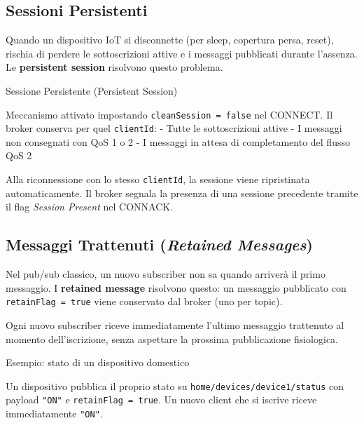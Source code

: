 \documentclass[
  italian,
  openany]{book}
\begin{document}
\subsection{Sessioni Persistenti}\label{sessioni-persistenti}

Quando un dispositivo IoT si disconnette (per sleep, copertura persa,
reset), rischia di perdere le sottoscrizioni attive e i messaggi
pubblicati durante l'assenza. Le \textbf{persistent session} risolvono
questo problema.

\begin{calloutdefinition}{Sessione Persistente (Persistent Session)}

Meccanismo attivato impostando \texttt{cleanSession\ =\ false} nel
CONNECT. Il broker conserva per quel \texttt{clientId}: - Tutte le
sottoscrizioni attive - I messaggi non consegnati con QoS 1 o 2 - I
messaggi in attesa di completamento del flusso QoS 2

\end{calloutdefinition}

Alla riconnessione con lo stesso \texttt{clientId}, la sessione viene
ripristinata automaticamente. Il broker segnala la presenza di una
sessione precedente tramite il flag \emph{Session Present} nel CONNACK.

\subsection{\texorpdfstring{Messaggi Trattenuti (\emph{Retained
Messages})}{Messaggi Trattenuti (Retained Messages)}}\label{messaggi-trattenuti-retained-messages}

Nel pub/sub classico, un nuovo subscriber non sa quando arriverà il
primo messaggio. I \textbf{retained message} risolvono questo: un
messaggio pubblicato con \texttt{retainFlag\ =\ true} viene conservato
dal broker (uno per topic).

Ogni nuovo subscriber riceve immediatamente l'ultimo messaggio
trattenuto al momento dell'iscrizione, senza aspettare la prossima
pubblicazione fisiologica.

\begin{callouttip}{Esempio: stato di un dispositivo domestico}

Un dispositivo pubblica il proprio stato su
\texttt{home/devices/device1/status} con payload \texttt{"ON"} e
\texttt{retainFlag\ =\ true}. Un nuovo client che si iscrive riceve
immediatamente \texttt{"ON"}.

\end{callouttip}
\end{document}
